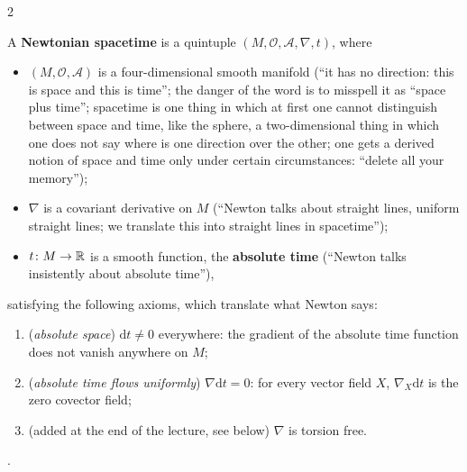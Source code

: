 \begin{paracol}{2}
\begin{definition}\label{def:c09-nst}
A \textbf{Newtonian spacetime} is a quintuple $(M,\mathcal O,\mathcal A,\nabla,t)$, where
\begin{itemize}
  \item $(M,\mathcal O,\mathcal A)$ is a four-dimensional smooth manifold (``it has no direction: this is space and this is time''; the danger of the word is to misspell it as ``space plus time''; spacetime is one thing in which at first one cannot distinguish between space and time, like the sphere, a two-dimensional thing in which one does not say where is one direction over the other; one gets a derived notion of space and time only under certain circumstances: ``delete all your memory'');
  \item $\nabla$ is a covariant derivative on $M$ (``Newton talks about straight lines, uniform straight lines; we translate this into straight lines in spacetime'');
  \item $t\colon M\to\mathbb{R}$ is a smooth function, the \textbf{absolute time} (``Newton talks insistently about absolute time''),
\end{itemize}
satisfying the following axioms, which translate what Newton says:
\begin{enumerate}
  \item (\emph{absolute space}) $\mathrm dt\neq0$ everywhere: the gradient of the absolute time function does not vanish anywhere on $M$;
  \item (\emph{absolute time flows uniformly}) $\nabla\mathrm dt=0$: for every vector field $X$, $\nabla_X\mathrm dt$ is the zero covector field;
  \item (added at the end of the lecture, see below) $\nabla$ is torsion free.
\end{enumerate}
\end{definition}
.


\end{paracol}
